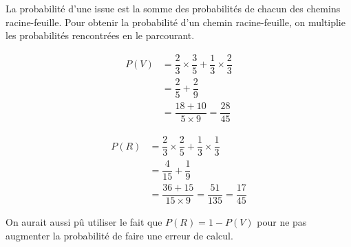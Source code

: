 {\begin{center}
	\end{center}
	La probabilité d'une issue est la somme des probabilités de chacun des chemins racine-feuille.
	Pour obtenir la probabilité d'un chemin racine-feuille, on multiplie les probabilités rencontrées en le parcourant.
	
		\begin{align*}
			P(V) &= \dfrac23 \times \dfrac35 + \dfrac13 \times \dfrac23 \\
				&= \dfrac25 + \dfrac29 \\
				&= \dfrac{18 + 10}{5 \times 9} = \dfrac{28}{45}
		\end{align*}
	
		\begin{align*}
			P(R) &= \dfrac23 \times \dfrac25 + \dfrac13 \times \dfrac13 \\
				&= \dfrac4{15} + \dfrac19 \\
				&= \dfrac{36 + 15}{15 \times 9} = \dfrac{51}{135} = \dfrac{17}{45}
		\end{align*}
		
		On aurait aussi pû utiliser le fait que $P(R) = 1 - P(V)$ pour ne pas augmenter la probabilité de faire une erreur de calcul.
}


\newpage
{}
\shipoutAnswer



